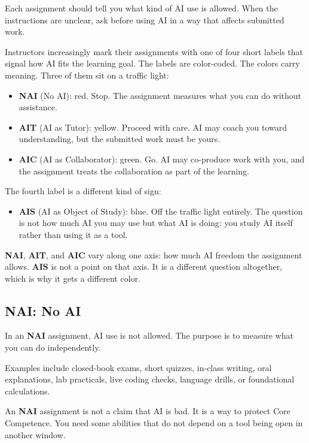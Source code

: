 \documentclass{SIAMbook2023}
\newcommand{\NAI}{\textcolor{catNAI}{\textbf{NAI}}}
\newcommand{\AIT}{\textcolor{catAIT}{\textbf{AIT}}}
\newcommand{\AIC}{\textcolor{catAIC}{\textbf{AIC}}}
\newcommand{\AIS}{\textcolor{catAIS}{\textbf{AIS}}}
\begin{document}
Each assignment should tell you what kind of AI use is allowed. When the instructions are unclear, ask before using AI in a way that affects submitted work.

Instructors increasingly mark their assignments with one of four short labels that signal how AI fits the learning goal. The labels are color-coded. The colors carry meaning. Three of them sit on a traffic light:

\begin{itemize}
\item \NAI{} (No AI): red. Stop. The assignment measures what you can do without assistance.
\item \AIT{} (AI as Tutor): yellow. Proceed with care. AI may coach you toward understanding, but the submitted work must be yours.
\item \AIC{} (AI as Collaborator): green. Go. AI may co-produce work with you, and the assignment treats the collaboration as part of the learning.
\end{itemize}

The fourth label is a different kind of sign:

\begin{itemize}
\item \AIS{} (AI as Object of Study): blue. Off the traffic light entirely. The question is not how much AI you may use but what AI is doing: you study AI itself rather than using it as a tool.
\end{itemize}

\NAI{}, \AIT{}, and \AIC{} vary along one axis: how much AI freedom the assignment allows. \AIS{} is not a point on that axis. It is a different question altogether, which is why it gets a different color.

\subsection{\texorpdfstring{\NAI{}: No AI}{NAI: No AI}}
\label{subsec:red}

In an \NAI{} assignment, AI use is not allowed. The purpose is to measure what you can do independently.

Examples include closed-book exams, short quizzes, in-class writing, oral explanations, lab practicals, live coding checks, language drills, or foundational calculations.

An \NAI{} assignment is not a claim that AI is bad. It is a way to protect Core Competence. You need some abilities that do not depend on a tool being open in another window.
\end{document}
